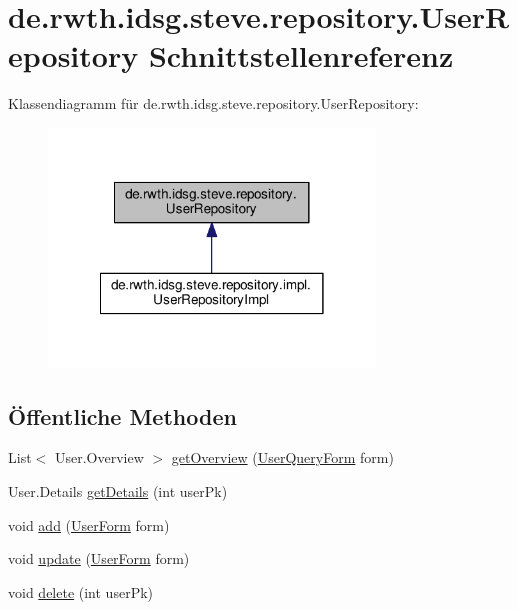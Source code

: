 \hypertarget{interfacede_1_1rwth_1_1idsg_1_1steve_1_1repository_1_1_user_repository}{\section{de.\-rwth.\-idsg.\-steve.\-repository.\-User\-Repository Schnittstellenreferenz}
\label{interfacede_1_1rwth_1_1idsg_1_1steve_1_1repository_1_1_user_repository}
}


Klassendiagramm für de.\-rwth.\-idsg.\-steve.\-repository.\-User\-Repository\-:\nopagebreak
\begin{figure}[H]
\begin{center}
\leavevmode
\includegraphics[width=246pt]{interfacede_1_1rwth_1_1idsg_1_1steve_1_1repository_1_1_user_repository__inherit__graph}
\end{center}
\end{figure}
\subsection*{Öffentliche Methoden}
\begin{DoxyCompactItemize}
\item 
List$<$ User.\-Overview $>$ \hyperlink{interfacede_1_1rwth_1_1idsg_1_1steve_1_1repository_1_1_user_repository_a5bd6560cf3b2e0c55e7cd21e5e48c7ee}{get\-Overview} (\hyperlink{classde_1_1rwth_1_1idsg_1_1steve_1_1web_1_1dto_1_1_user_query_form}{User\-Query\-Form} form)
\item 
User.\-Details \hyperlink{interfacede_1_1rwth_1_1idsg_1_1steve_1_1repository_1_1_user_repository_a60f2322c3b19fa2db03026a89a11ba4e}{get\-Details} (int user\-Pk)
\item 
void \hyperlink{interfacede_1_1rwth_1_1idsg_1_1steve_1_1repository_1_1_user_repository_abb61898f9441b72f02c8739b3f7702a2}{add} (\hyperlink{classde_1_1rwth_1_1idsg_1_1steve_1_1web_1_1dto_1_1_user_form}{User\-Form} form)
\item 
void \hyperlink{interfacede_1_1rwth_1_1idsg_1_1steve_1_1repository_1_1_user_repository_a4620073de7287f73d573d947f1c6dc21}{update} (\hyperlink{classde_1_1rwth_1_1idsg_1_1steve_1_1web_1_1dto_1_1_user_form}{User\-Form} form)
\item 
void \hyperlink{interfacede_1_1rwth_1_1idsg_1_1steve_1_1repository_1_1_user_repository_a5cd54ce3b5607bd049ccfede5fc8ef07}{delete} (int user\-Pk)
\end{DoxyCompactItemize}



